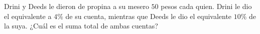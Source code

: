 Drini y Deeds le dieron de propina a su mesero $50$ pesos cada quien. Drini le dio el equivalente a $4\%$ de su cuenta, mientras que Deeds le dio el equivalente $10\%$ de la suya. ¿Cuál es el suma total de ambas cuentas?